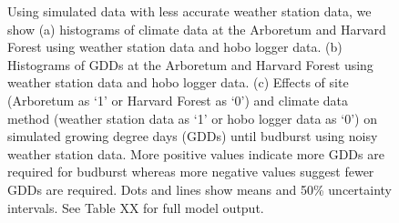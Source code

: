 \documentclass{article}\usepackage[]{graphicx}\usepackage[]{color}
\begin{document}
\begin{figure}
\caption{ Using simulated data with less accurate weather station data, we show (a) histograms of climate data at the Arboretum and Harvard Forest using weather station data and hobo logger data. (b) Histograms of GDDs at the Arboretum and Harvard Forest using weather station data and hobo logger data. (c) Effects of site (Arboretum as `1' or Harvard Forest as `0') and climate data method (weather station data as `1' or hobo logger data as `0') on simulated growing degree days (GDDs) until budburst using noisy weather station data. More positive values indicate more GDDs are required for budburst whereas more negative values suggest fewer GDDs are required. Dots and lines show means and 50\% uncertainty intervals. See Table XX for full model output.}
\label{fig:noisyws}
\end{figure}
\end{document}
